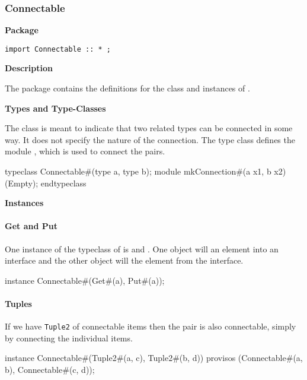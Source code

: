 \subsubsection{Connectable}
\label{lib-connectable}

{\bf Package }


\begin{verbatim}
import Connectable :: * ;
\end{verbatim}

{\bf Description}

The  package contains the definitions for the class
 and  instances of . 


{\bf Types and Type-Classes}

The class  is meant to indicate that
two related types can be connected in some way.  It does not specify the nature
of the connection.  The  type class defines the module
, which is used to connect the pairs.

\begin{libverbatim}
typeclass Connectable#(type a, type b);
    module mkConnection#(a x1, b x2)(Empty);
endtypeclass
\end{libverbatim}

{\bf Instances}
\paragraph {Get and Put} One instance of the typeclass of
  is  and .  One
object will 
an element into an interface and the other object will  the
element from the interface.

\begin{libverbatim}
instance Connectable#(Get#(a), Put#(a));
\end{libverbatim}

\paragraph{Tuples} If we have {\tt Tuple2} of connectable items
then the  pair is also
connectable, simply by connecting the individual items.
\begin{libverbatim}
instance Connectable#(Tuple2#(a, c), Tuple2#(b, d))
  provisos (Connectable#(a, b), Connectable#(c, d));
\end{libverbatim}

